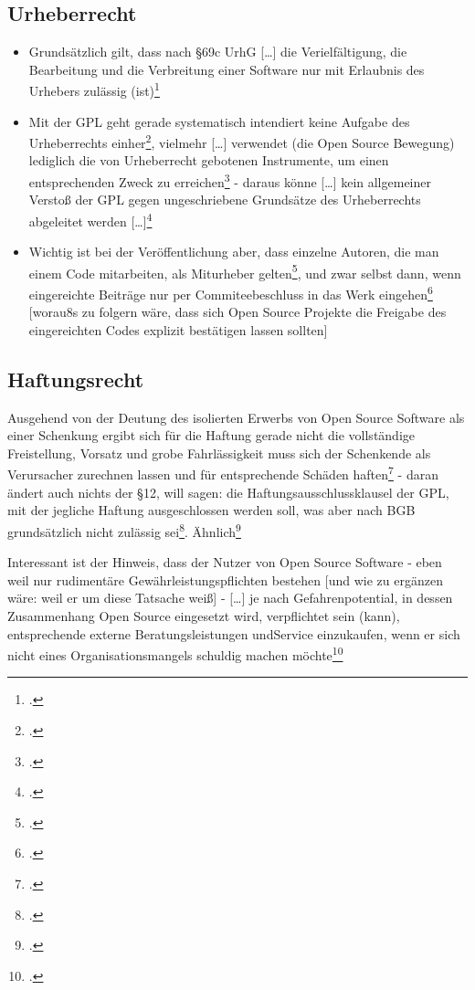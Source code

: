 \documentclass[DIV=calc,BCOR=5mm,11pt,headings=small,oneside,abstract=true, toc=bib]{scrartcl}
\begin{document}
\subsection{Urheberrecht}

\begin{itemize}
  \item Grundsätzlich gilt, dass \glqq{}nach §69c UrhG [\ldots] die
  Verielfältigung, die Bearbeitung und die Verbreitung einer Software nur
  mit Erlaubnis des Urhebers zulässig (ist)\grqq{}\footcite[][22]{Spindler2004a}
  \item Mit der GPL geht gerade systematisch intendiert \glqq{}keine
  Aufgabe des Urheberrechts\grqq{} einher\footcite[][22]{Spindler2004a},
  vielmehr \glqq{}[\ldots] verwendet (die Open Source Bewegung) lediglich
  die von Urheberrecht gebotenen Instrumente, um einen entsprechenden
  Zweck zu erreichen\grqq{}\footcite[vgl.][26]{Spindler2004a} - daraus könne
  \glqq{}[\ldots] kein allgemeiner Verstoß der GPL gegen ungeschriebene
  Grundsätze des Urheberrechts abgeleitet werden
  [\ldots]\grqq{}\footcite[vgl.][25]{Spindler2004a}
  \item Wichtig ist bei der Veröffentlichung aber, dass einzelne Autoren, die
  man einem Code mitarbeiten, als \glqq{}Miturheber\grqq{}
  gelten\footcite[vgl.][27]{Spindler2004a}, und zwar selbst dann, wenn
  eingereichte Beiträge nur per Commiteebeschluss in das Werk
  eingehen\footcite[vgl.][28]{Spindler2004a} [worau8s zu folgern wäre, dass
  sich Open Source Projekte die Freigabe des eingereichten Codes explizit
  bestätigen lassen sollten]
\end{itemize}

\subsection{Haftungsrecht}

Ausgehend von der Deutung des \glqq{}isolierten Erwerbs\grqq{} von Open Source
Software als einer \glqq{}Schenkung\grqq{} ergibt sich für die Haftung gerade
nicht die vollständige Freistellung, \glqq{}Vorsatz und grobe
Fahrlässigkeit\grqq{} muss sich der Schenkende als Verursacher zurechnen lassen
und für entsprechende Schäden haften\footcite[vgl.][169f]{Spindler2004a} - daran
ändert auch nichts der §12, will sagen: die Haftungsausschlussklausel der GPL,
mit der jegliche Haftung ausgeschlossen werden soll, was aber nach BGB
grundsätzlich nicht zulässig sei\footcite[vgl.][170]{Spindler2004a}.
Ähnlich\footcite[vgl.][205]{Spindler2004a}

Interessant ist der Hinweis, dass der \glqq{}Nutzer\grqq{} von Open Source
Software - eben weil nur rudimentäre Gewährleistungspflichten bestehen [und
wie zu ergänzen wäre: weil er um diese Tatsache weiß] - \glqq{}[\ldots]
je nach Gefahrenpotential, in dessen Zusammenhang Open Source eingesetzt
wird, verpflichtet sein (kann), entsprechende externe Beratungsleistungen
undService einzukaufen, wenn er sich nicht eines Organisationsmangels
schuldig machen möchte\grqq{}\footcite[vgl.][221]{Spindler2004a}

\small



\end{document}
